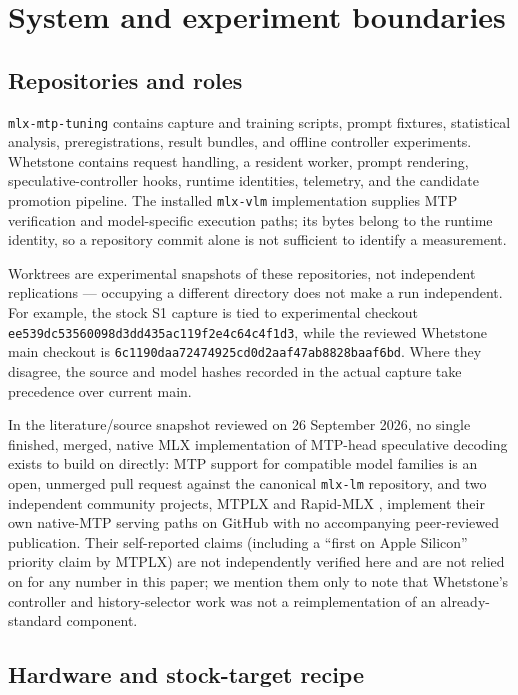 \documentclass[
  11pt,
]{article}
\begin{document}
\section{System and experiment
boundaries}\label{system-and-experiment-boundaries}

\subsection{Repositories and roles}\label{repositories-and-roles}

\texttt{mlx-mtp-tuning} contains capture and training scripts, prompt
fixtures, statistical analysis, preregistrations, result bundles, and
offline controller experiments. Whetstone contains request handling, a
resident worker, prompt rendering, speculative-controller hooks, runtime
identities, telemetry, and the candidate promotion pipeline. The
installed \texttt{mlx-vlm} implementation supplies MTP verification and
model-specific execution paths; its bytes belong to the runtime
identity, so a repository commit alone is not sufficient to identify a
measurement.

Worktrees are experimental snapshots of these repositories, not
independent replications --- occupying a different directory does not
make a run independent. For example, the stock S1 capture is tied to
experimental checkout \texttt{ee539dc53560098d3dd435ac119f2e4c64c4f1d3},
while the reviewed Whetstone main checkout is
\texttt{6c1190daa72474925cd0d2aaf47ab8828baaf6bd}. Where they disagree,
the source and model hashes recorded in the actual capture take
precedence over current main.

In the literature/source snapshot reviewed on 26 September 2026, no
single finished, merged, native MLX implementation of MTP-head
speculative decoding exists to build on directly: MTP support for
compatible model families is an open, unmerged pull request against the
canonical \texttt{mlx-lm} repository, and two independent community
projects, MTPLX \citep{mtplx2026} and Rapid-MLX \citep{rapidmlx2026},
implement their own native-MTP serving paths on GitHub with no
accompanying peer-reviewed publication. Their self-reported claims
(including a ``first on Apple Silicon'' priority claim by MTPLX) are not
independently verified here and are not relied on for any number in this
paper; we mention them only to note that Whetstone's controller and
history-selector work was not a reimplementation of an already-standard
component.

\subsection{Hardware and stock-target
recipe}\label{hardware-and-stock-target-recipe}
\end{document}
